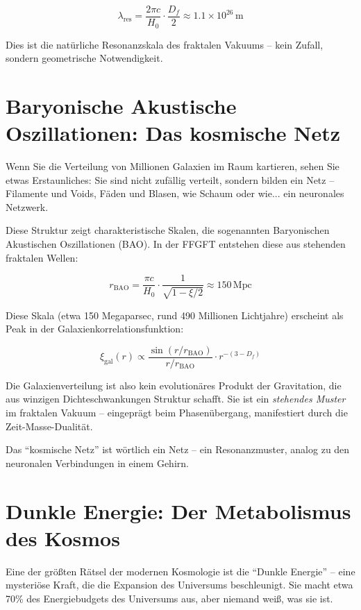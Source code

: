 \documentclass[12pt,a4paper]{article}
\begin{document}
\begin{equation}
\lambda_{\text{res}} = \frac{2\pi c}{H_0} \cdot \frac{D_f}{2} \approx 1.1 \times 10^{26} \, \text{m}
\end{equation}

Dies ist die natürliche Resonanzskala des fraktalen Vakuums -- kein Zufall, sondern geometrische Notwendigkeit.

\section{Baryonische Akustische Oszillationen: Das kosmische Netz}

Wenn Sie die Verteilung von Millionen Galaxien im Raum kartieren, sehen Sie etwas Erstaunliches: Sie sind nicht zufällig verteilt, sondern bilden ein Netz -- Filamente und Voids, Fäden und Blasen, wie Schaum oder wie... ein neuronales Netzwerk.

Diese Struktur zeigt charakteristische Skalen, die sogenannten Baryonischen Akustischen Oszillationen (BAO). In der FFGFT entstehen diese aus stehenden fraktalen Wellen:

\begin{equation}
r_{\text{BAO}} = \frac{\pi c}{H_0} \cdot \frac{1}{\sqrt{1 - \xi/2}} \approx 150 \, \text{Mpc}
\end{equation}

Diese Skala (etwa 150 Megaparsec, rund 490 Millionen Lichtjahre) erscheint als Peak in der Galaxienkorrelationsfunktion:

\begin{equation}
\xi_{\text{gal}}(r) \propto \frac{\sin(r/r_{\text{BAO}})}{r/r_{\text{BAO}}} \cdot r^{-(3-D_f)}
\end{equation}

Die Galaxienverteilung ist also kein evolutionäres Produkt der Gravitation, die aus winzigen Dichteschwankungen Struktur schafft. Sie ist ein \textit{stehendes Muster} im fraktalen Vakuum -- eingeprägt beim Phasenübergang, manifestiert durch die Zeit-Masse-Dualität.

Das ``kosmische Netz'' ist wörtlich ein Netz -- ein Resonanzmuster, analog zu den neuronalen Verbindungen in einem Gehirn.

\section{Dunkle Energie: Der Metabolismus des Kosmos}

Eine der größten Rätsel der modernen Kosmologie ist die ``Dunkle Energie'' -- eine mysteriöse Kraft, die die Expansion des Universums beschleunigt. Sie macht etwa 70\% des Energiebudgets des Universums aus, aber niemand weiß, was sie ist.
\end{document}
